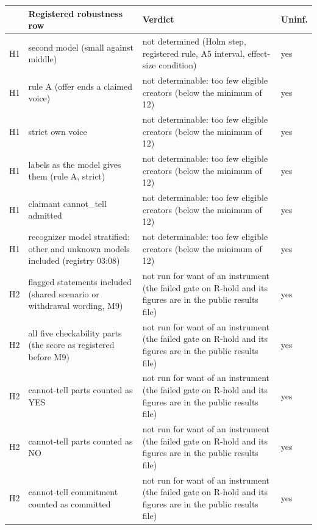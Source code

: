 {\tiny\setlength{\tabcolsep}{2pt}
\begin{tabular}{@{}lp{}p{}l@{}}
\toprule
 & Registered robustness row & Verdict & Uninf. \\
\midrule
H1 & second model (small against middle) & not determined (Holm step, registered rule, A5 interval, effect-size condition) & yes \\
H1 & rule A (offer ends a claimed voice) & not determinable: too few eligible creators (below the minimum of 12) & yes \\
H1 & strict own voice & not determinable: too few eligible creators (below the minimum of 12) & yes \\
H1 & labels as the model gives them (rule A, strict) & not determinable: too few eligible creators (below the minimum of 12) & yes \\
H1 & claimant cannot\_tell admitted & not determinable: too few eligible creators (below the minimum of 12) & yes \\
H1 & recognizer model stratified: other and unknown models included (registry 03:08) & not determinable: too few eligible creators (below the minimum of 12) & yes \\
H2 & flagged statements included (shared scenario or withdrawal wording, M9) & not run for want of an instrument (the failed gate on R-hold and its figures are in the public results file) & yes \\
H2 & all five checkability parts (the score as registered before M9) & not run for want of an instrument (the failed gate on R-hold and its figures are in the public results file) & yes \\
H2 & cannot-tell parts counted as YES & not run for want of an instrument (the failed gate on R-hold and its figures are in the public results file) & yes \\
H2 & cannot-tell parts counted as NO & not run for want of an instrument (the failed gate on R-hold and its figures are in the public results file) & yes \\
H2 & cannot-tell commitment counted as committed & not run for want of an instrument (the failed gate on R-hold and its figures are in the public results file) & yes \\

\end{tabular}}
